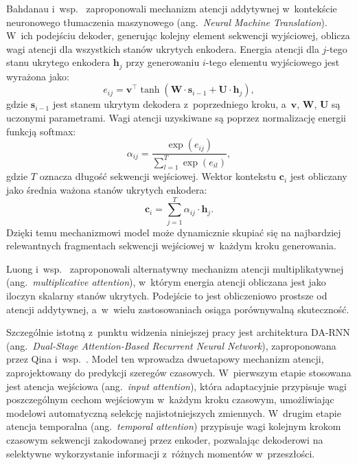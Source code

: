 Bahdanau i~wsp.~\cite{bahdanau2015attention} zaproponowali mechanizm atencji addytywnej w~kontekście neuronowego tłumaczenia maszynowego (ang.~\textit{Neural Machine Translation}). W~ich podejściu dekoder, generując kolejny element sekwencji wyjściowej, oblicza wagi atencji dla wszystkich stanów ukrytych enkodera. Energia atencji dla $j$-tego stanu ukrytego enkodera $\mathbf{h}_j$ przy generowaniu $i$-tego elementu wyjściowego jest wyrażona jako:
\begin{equation}
\label{eq:attention-energy}
e_{ij} = \mathbf{v}^{\top} \tanh(\mathbf{W} \cdot \mathbf{s}_{i-1} + \mathbf{U} \cdot \mathbf{h}_j),
\end{equation}
gdzie $\mathbf{s}_{i-1}$ jest stanem ukrytym dekodera z~poprzedniego kroku, a~$\mathbf{v}$, $\mathbf{W}$, $\mathbf{U}$ są uczonymi parametrami. Wagi atencji uzyskiwane są poprzez normalizację energii funkcją softmax:
\begin{equation}
\label{eq:attention-weights}
\alpha_{ij} = \frac{\exp(e_{ij})}{\sum_{l=1}^{T} \exp(e_{il})},
\end{equation}
gdzie $T$ oznacza długość sekwencji wejściowej. Wektor kontekstu $\mathbf{c}_i$ jest obliczany jako średnia ważona stanów ukrytych enkodera:
\begin{equation}
\label{eq:attention-context}
\mathbf{c}_i = \sum_{j=1}^{T} \alpha_{ij} \cdot \mathbf{h}_j.
\end{equation}
Dzięki temu mechanizmowi model może dynamicznie skupiać się na najbardziej relewantnych fragmentach sekwencji wejściowej w~każdym kroku generowania.

Luong i~wsp.~\cite{luong2015attention} zaproponowali alternatywny mechanizm atencji multiplikatywnej (ang.~\textit{multiplicative attention}), w~którym energia atencji obliczana jest jako iloczyn skalarny stanów ukrytych. Podejście to jest obliczeniowo prostsze od atencji addytywnej, a~w~wielu zastosowaniach osiąga porównywalną skuteczność.

Szczególnie istotną z~punktu widzenia niniejszej pracy jest architektura DA-RNN (ang.~\textit{Dual-Stage Attention-Based Recurrent Neural Network}), zaproponowana przez Qina i~wsp.~\cite{qin2017darnn}. Model ten wprowadza dwuetapowy mechanizm atencji, zaprojektowany do predykcji szeregów czasowych. W~pierwszym etapie stosowana jest atencja wejściowa (ang.~\textit{input attention}), która adaptacyjnie przypisuje wagi poszczególnym cechom wejściowym w~każdym kroku czasowym, umożliwiając modelowi automatyczną selekcję najistotniejszych zmiennych. W~drugim etapie atencja temporalna (ang.~\textit{temporal attention}) przypisuje wagi kolejnym krokom czasowym sekwencji zakodowanej przez enkoder, pozwalając dekoderowi na selektywne wykorzystanie informacji z~różnych momentów w~przeszłości.


